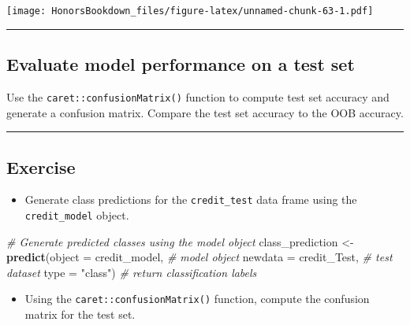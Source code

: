 \documentclass[
]{book}
\newenvironment{Shaded}{\begin{snugshade}}{\end{snugshade}}
\newcommand{\CommentTok}[1]{\textcolor[rgb]{0.56,0.35,0.01}{\textit{#1}}}
\newcommand{\DataTypeTok}[1]{\textcolor[rgb]{0.13,0.29,0.53}{#1}}
\newcommand{\KeywordTok}[1]{\textcolor[rgb]{0.13,0.29,0.53}{\textbf{#1}}}
\newcommand{\NormalTok}[1]{#1}
\newcommand{\StringTok}[1]{\textcolor[rgb]{0.31,0.60,0.02}{#1}}
\providecommand{\tightlist}{%
  \setlength{\itemsep}{0pt}\setlength{\parskip}{0pt}}
\begin{document}
\texttt{[image: HonorsBookdown\_files/figure-latex/unnamed-chunk-63-1.pdf]}

\begin{center}\rule{0.5\linewidth}{0.5pt}\end{center}

\hypertarget{evaluate-model-performance-on-a-test-set}{%
\subsection{Evaluate model performance on a test set}\label{evaluate-model-performance-on-a-test-set}}

Use the \texttt{caret::confusionMatrix()} function to compute test set accuracy and generate a confusion matrix. Compare the test set accuracy to the OOB accuracy.

\begin{center}\rule{0.5\linewidth}{0.5pt}\end{center}

\hypertarget{exercise-18}{%
\subsection*{Exercise}\label{exercise-18}}

\begin{itemize}
\tightlist
\item
  Generate class predictions for the \texttt{credit\_test} data frame using the \texttt{credit\_model} object.
\end{itemize}

\begin{Shaded}
\begin{Highlighting}[]
\CommentTok{# Generate predicted classes using the model object}
\NormalTok{class_prediction <-}\StringTok{ }\KeywordTok{predict}\NormalTok{(}\DataTypeTok{object =}\NormalTok{ credit_model,   }\CommentTok{# model object }
                            \DataTypeTok{newdata =}\NormalTok{ credit_Test,  }\CommentTok{# test dataset}
                            \DataTypeTok{type =} \StringTok{"class"}\NormalTok{) }\CommentTok{# return classification labels}
\end{Highlighting}
\end{Shaded}

\begin{itemize}
\tightlist
\item
  Using the \texttt{caret::confusionMatrix()} function, compute the confusion matrix for the test set.
\end{itemize}
\end{document}
